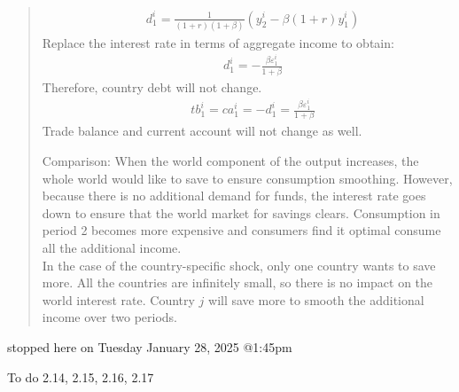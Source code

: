 \begin{exercise}
\begin{quote}
\begin{enumerate}
\begin{enumerate}
 \begin{align*}
&d^i_1 = \frac{1}{(1+r)(1+\beta)}(y^i_2 - \beta(1+r)y^i_1)
\end{align*}
Replace the interest rate in terms of aggregate income to obtain:
 \begin{align*}
& d^i_1 = -\frac{\beta \varepsilon_1^i}{1+\beta}
\end{align*}
Therefore, country debt will not change.
\begin{align*}
&tb^i_1 = ca^i_1 =  -d_1^i = \frac{\beta \varepsilon_1^i}{1+\beta}
\end{align*} 
 Trade balance and current account will not change as well.
\end{enumerate}

Comparison:  When the world component of the output increases, the whole world would like to save to ensure consumption smoothing. However, because there is no additional demand for funds, the interest rate goes down to ensure that the world market for savings clears. Consumption in period 2 becomes more expensive and consumers find it optimal consume all the additional income.
\\ In the case of the country-specific shock, only one country wants to save more. All the countries are infinitely small, so there is no impact on the world interest rate. Country $j$  will save more to smooth the additional income over two periods.
\end{enumerate}  
\end{quote}
\end{exercise} 

stopped here on Tuesday January 28, 2025 @1:45pm

To do 2.14, 2.15, 2.16, 2.17





